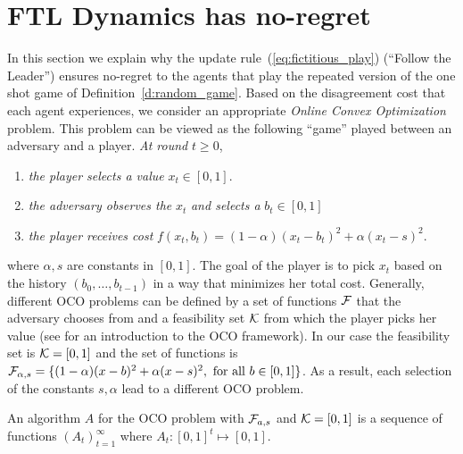 \section{FTL Dynamics has no-regret}\label{s:fictitious_noregret}
In this section we explain why the
update rule~(\ref{eq:fictitious_play}) (\enquote{Follow the Leader}) ensures
no-regret to the agents that play the repeated version of the one shot
game of Definition~\ref{d:random_game}.
Based on the disagreement cost that each agent experiences,
we consider an appropriate \emph{Online Convex Optimization} problem.
This problem can be viewed as the following \enquote{game} played between an
adversary and a player. \emph{At round }$t\geq 0$,
\begin{enumerate}
  \item \emph{the player selects a value }$x_t \in [0,1]$.
  \item \emph{the adversary observes the }$x_t$ \emph{and selects a} $b_t \in [0,1]$
  \item \emph{the player receives cost} $f(x_t,b_t)=(1-\alpha)(x_t-b_t)^2 + \alpha(x_t -s)^2$.
\end{enumerate}
where $\alpha,s$ are constants in $[0,1]$. The goal of
the player is to pick $x_t$ based on the history
$(b_0,\ldots,b_{t-1})$ in a way that minimizes her total cost.
Generally, different OCO problems can be defined by a set of functions
$\mathcal{F}$ that the adversary chooses from and a feasibility
set $\mathcal{K}$ from which the player picks her value (see \cite{Haz16}
for an introduction to the OCO framework).
In our case the feasibility set is $\mathcal{K}=[0,1]$ and the set of functions is $\mathcal{F}_{\alpha,s} = \{(1-\alpha)(x-b)^2 +
\alpha(x -s)^2,~\text{for all }b \in [0,1]\}$.
As a result, each selection of the
constants $s,\alpha$ lead to a different OCO problem.

\begin{definition}\label{d:OCO_algo}
An algorithm $A$ for the OCO problem with $\mathcal{F}_{a,s}$ and
$\mathcal{K}=[0,1]$ is a sequence of functions $(A_t)_{t=1}^\infty$ where $A_t:[0,1]^t \mapsto [0,1]$.
\end{definition}

